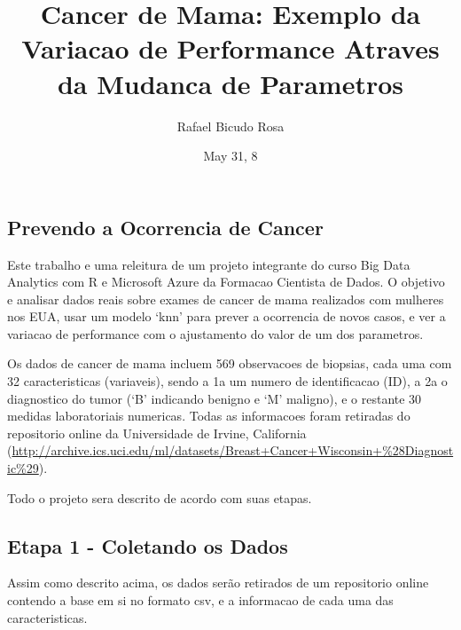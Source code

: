\documentclass[]{article}
\title{Cancer de Mama: Exemplo da Variacao de Performance Atraves da Mudanca de
Parametros}
\author{Rafael Bicudo Rosa}
\date{May 31, 8}
\begin{document}
\maketitle

\subsection{Prevendo a Ocorrencia de
Cancer}\label{prevendo-a-ocorrencia-de-cancer}

Este trabalho e uma releitura de um projeto integrante do curso Big Data
Analytics com R e Microsoft Azure da Formacao Cientista de Dados. O
objetivo e analisar dados reais sobre exames de cancer de mama
realizados com mulheres nos EUA, usar um modelo `knn' para prever a
ocorrencia de novos casos, e ver a variacao de performance com o
ajustamento do valor de um dos parametros.

Os dados de cancer de mama incluem 569 observacoes de biopsias, cada uma
com 32 caracteristicas (variaveis), sendo a 1a um numero de
identificacao (ID), a 2a o diagnostico do tumor (`B' indicando benigno e
`M' maligno), e o restante 30 medidas laboratoriais numericas. Todas as
informacoes foram retiradas do repositorio online da Universidade de
Irvine, California
(\url{http://archive.ics.uci.edu/ml/datasets/Breast+Cancer+Wisconsin+\%28Diagnostic\%29}).

Todo o projeto sera descrito de acordo com suas etapas.

\subsection{Etapa 1 - Coletando os
Dados}\label{etapa-1---coletando-os-dados}

Assim como descrito acima, os dados serão retirados de um repositorio
online contendo a base em si no formato csv, e a informacao de cada uma
das caracteristicas.
\end{document}
